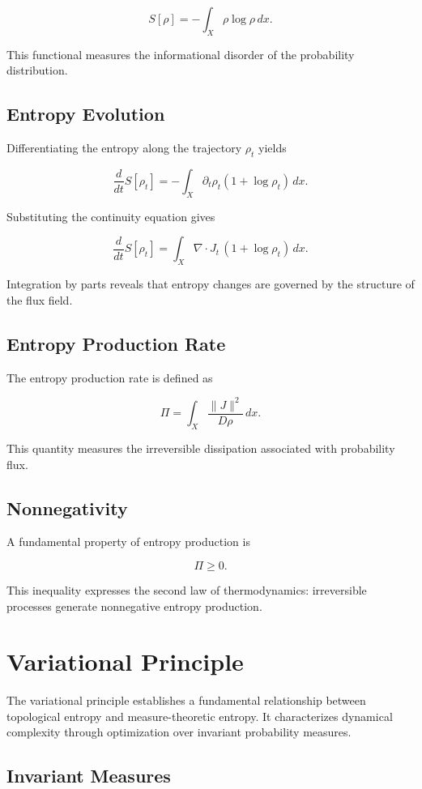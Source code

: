 \documentclass[12pt]{article}
\begin{document}
\[
S[\rho] = -\int_X \rho \log \rho \, dx.
\]

This functional measures the informational disorder of the probability distribution.

\subsection{Entropy Evolution}

Differentiating the entropy along the trajectory $\rho_t$ yields

\[
\frac{d}{dt}S[\rho_t]
=
-\int_X \partial_t \rho_t (1+\log \rho_t)\,dx.
\]

Substituting the continuity equation gives

\[
\frac{d}{dt}S[\rho_t]
=
\int_X \nabla \cdot J_t \, (1+\log \rho_t)\,dx.
\]

Integration by parts reveals that entropy changes are governed by the structure of the flux field.

\subsection{Entropy Production Rate}

The entropy production rate is defined as

\[
\Pi = \int_X \frac{\|J\|^2}{D\rho}\,dx.
\]

This quantity measures the irreversible dissipation associated with probability flux.

\subsection{Nonnegativity}

A fundamental property of entropy production is

\[
\Pi \ge 0.
\]

This inequality expresses the second law of thermodynamics: irreversible processes generate nonnegative entropy production.

\section{Variational Principle}

The variational principle establishes a fundamental relationship between topological entropy and measure-theoretic entropy. It characterizes dynamical complexity through optimization over invariant probability measures.

\subsection{Invariant Measures}
\end{document}
